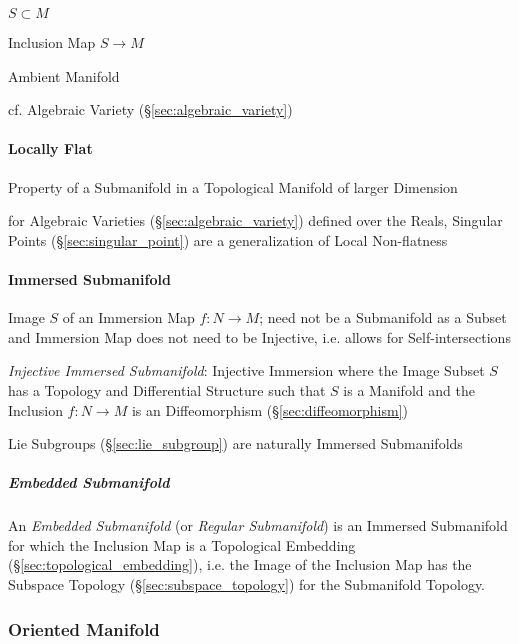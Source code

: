 $S \subset M$

Inclusion Map $S \rightarrow M$

Ambient Manifold

cf. Algebraic Variety (\S\ref{sec:algebraic_variety})



\paragraph{Locally Flat}\label{sec:locally_flat}\hfill

Property of a Submanifold in a Topological Manifold of larger Dimension

for Algebraic Varieties (\S\ref{sec:algebraic_variety}) defined over the Reals,
Singular Points (\S\ref{sec:singular_point}) are a generalization of Local
Non-flatness



\paragraph{Immersed Submanifold}\label{sec:immersed_submanifold}\hfill

Image $S$ of an Immersion Map $f : N \rightarrow M$; need not be a Submanifold
as a Subset and Immersion Map does not need to be Injective, i.e. allows for
Self-intersections

\emph{Injective Immersed Submanifold}: Injective Immersion where the Image
Subset $S$ has a Topology and Differential Structure such that $S$ is a
Manifold and the Inclusion $f : N \rightarrow M$ is an Diffeomorphism
(\S\ref{sec:diffeomorphism})

\fist Lie Subgroups (\S\ref{sec:lie_subgroup}) are naturally Immersed
Submanifolds



\subparagraph{Embedded Submanifold}\label{sec:embedded_submanifold}\hfill

An \emph{Embedded Submanifold} (or \emph{Regular Submanifold}) is an Immersed
Submanifold for which the Inclusion Map is a Topological Embedding
(\S\ref{sec:topological_embedding}), i.e. the Image of the Inclusion Map
has the Subspace Topology (\S\ref{sec:subspace_topology}) for the Submanifold
Topology.



\subsubsection{Oriented Manifold}\label{sec:oriented_manifold}

